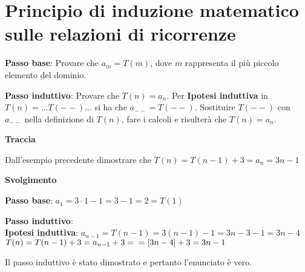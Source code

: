 \section{Principio di induzione matematico sulle relazioni di ricorrenze}
\textbf{Passo base}: Provare che $a_m = T(m)$, dove $m$ rappresenta il più piccolo elemento del dominio.

\textbf{Passo induttivo}: Provare che $T(n) = a_n$. Per \textbf{Ipotesi induttiva} in $T(n) = ... T(--)...$ si ha che $a_{--} = T(--)$. Sostituire $T(--)$ con $a_{--}$ nella definizione di $T(n)$, fare i calcoli e risulterà che $T(n) = a_n$.

\begin{example}
\phantom{}
\centerline{\textbf{Traccia}}

Dall'esempio precedente dimostrare che $T(n) = T(n - 1) + 3 = a_n = 3n - 1$

\centerline{\textbf{Svolgimento}}
\textbf{Passo base}: $a_1 = 3 \cdot 1 - 1 = 3 - 1 = 2 = T(1)$

\textbf{Passo induttivo}: \\
\textbf{Ipotesi induttiva}: $a_{n-1} = T(n - 1) = 3(n - 1) - 1 = 3n - 3 - 1 = 3n - 4$ \\
$T(n) = T(n - 1) + 3 = a_{n-1} + 3 = \\ 
= [3n - 4] + 3 = 3n - 1$

Il passo induttivo è stato dimostrato e pertanto l'enunciato è vero.

\end{example}

